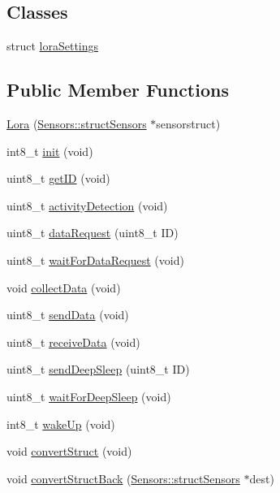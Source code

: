 \subsection*{Classes}
\begin{DoxyCompactItemize}
\item 
struct \hyperlink{struct_lora_1_1lora_settings}{lora\+Settings}
\end{DoxyCompactItemize}
\subsection*{Public Member Functions}
\begin{DoxyCompactItemize}
\item 
\hyperlink{class_lora_a828bc4febabc3d8ce409d226fafaccf1}{Lora} (\hyperlink{struct_sensors_1_1struct_sensors}{Sensors\+::struct\+Sensors} $\ast$sensorstruct)
\item 
int8\+\_\+t \hyperlink{class_lora_a7a2c376c0eea2715cd4d976a2d0b1ff9}{init} (void)
\item 
uint8\+\_\+t \hyperlink{class_lora_a3893f74b58a9e696e99bcc08f417aaed}{get\+ID} (void)
\item 
uint8\+\_\+t \hyperlink{class_lora_ac1353b12ea1094a2fc79887556613d87}{activity\+Detection} (void)
\item 
uint8\+\_\+t \hyperlink{class_lora_ac17ac3b6aa37ae63fee774bf32a9651f}{data\+Request} (uint8\+\_\+t ID)
\item 
uint8\+\_\+t \hyperlink{class_lora_aabe28ca7e6605cfa1c828aa7b0e3204d}{wait\+For\+Data\+Request} (void)
\item 
void \hyperlink{class_lora_adc489dee222212aaa024708342979a55}{collect\+Data} (void)
\item 
uint8\+\_\+t \hyperlink{class_lora_a272ad34d041a5ce7f6e7f0bb449f5897}{send\+Data} (void)
\item 
uint8\+\_\+t \hyperlink{class_lora_a9a17db362492abeeb63e2184a6eefda8}{receive\+Data} (void)
\item 
uint8\+\_\+t \hyperlink{class_lora_ad7aa04fa0786201ead141699446491d3}{send\+Deep\+Sleep} (uint8\+\_\+t ID)
\item 
uint8\+\_\+t \hyperlink{class_lora_af312b9416d9114ed07bb3a0dbad81ac2}{wait\+For\+Deep\+Sleep} (void)
\item 
int8\+\_\+t \hyperlink{class_lora_a1dfacb6c20da34f6c3b10685b66f7201}{wake\+Up} (void)
\item 
void \hyperlink{class_lora_a6a411c5ee5e9f476676f0cd0a57b7a83}{convert\+Struct} (void)
\item 
void \hyperlink{class_lora_a5339d28dcbd3a1eafd5523e660d627af}{convert\+Struct\+Back} (\hyperlink{struct_sensors_1_1struct_sensors}{Sensors\+::struct\+Sensors} $\ast$dest)
\end{DoxyCompactItemize}
